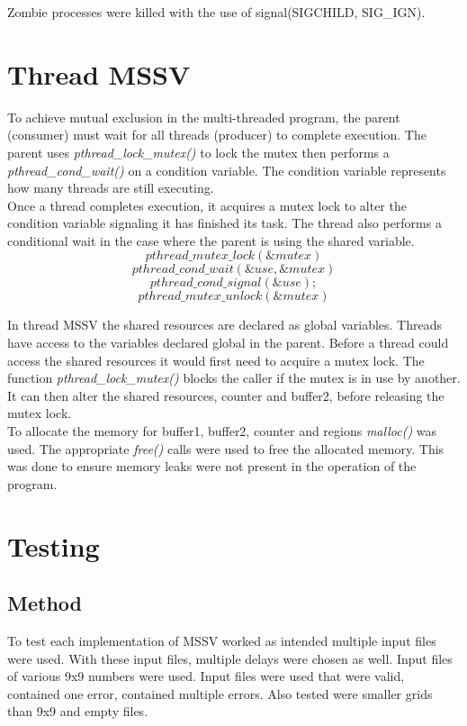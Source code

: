 \documentclass[]{article}
\begin{document}
\vspace{0.2cm}
	
Zombie processes were killed with the use of signal(SIGCHILD, SIG\_IGN).


\section{Thread MSSV}
To achieve mutual exclusion in the multi-threaded program, the parent (consumer) must wait for all threads (producer) to complete execution. The parent uses \textit{pthread\_lock\_mutex()} to lock the mutex then performs a \textit{pthread\_cond\_wait()} on a condition variable. The condition variable represents how many threads are still executing. \\

Once a thread completes execution, it acquires a mutex lock to alter the condition variable signaling it has finished its task. The thread also performs a conditional wait in the case where the parent is using the shared variable. \\
$$
pthread\_mutex\_lock(\&mutex )
$$
$$
pthread\_cond\_wait(\&use, \&mutex)
$$
$$
pthread\_cond\_signal(\&use);
$$
$$
pthread\_mutex\_unlock(\&mutex)
$$
\vspace{0.2cm}

In thread MSSV the shared resources are declared as global variables. Threads have access to the variables declared global in the parent. Before a thread could access the shared resources it would first need to acquire a mutex lock. The function \textit{pthread\_lock\_mutex()} blocks the caller if the mutex is in use by another. It can then alter the shared resources, counter and buffer2, before releasing the mutex lock.\\

To allocate the memory for buffer1, buffer2, counter and regions \textit{malloc()} was used. The appropriate \textit{free()} calls were used to free the allocated memory. This was done to ensure memory leaks were not present in the operation of the program. 

\pagebreak
\section{Testing}
\subsection{Method}
To test each implementation of MSSV worked as intended multiple input files were used. With these input files, multiple delays were chosen as well. Input files of various 9x9 numbers were used. Input files were used that were valid, contained one error, contained multiple errors. Also tested were smaller grids than 9x9 and empty files. \\
\end{document}
